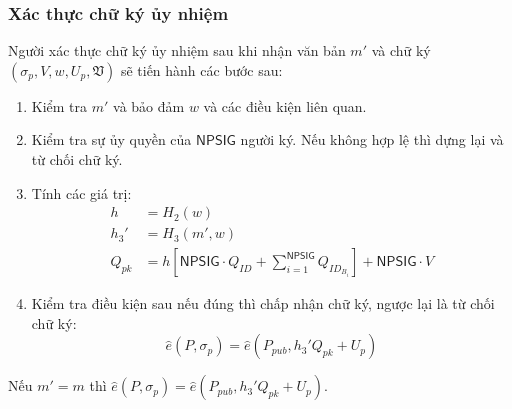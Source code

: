 \subsubsection{Xác thực chữ ký ủy nhiệm}
Người xác thực chữ ký ủy nhiệm sau khi nhận văn bản $m'$ và chữ ký  $(\sigma_p,V,w,U_p,\mathfrak{V})$ sẽ tiến hành các bước sau:
\begin{enumerate}[label=(\arabic*)]
	\item Kiểm tra $m'$ và bảo đảm $w$ và các điều kiện liên quan.
	\item Kiểm tra sự ủy quyền của $\mathsf{NPSIG}$ người ký. Nếu không hợp lệ thì dựng lại và từ chối chữ ký.
	\item Tính các giá trị:
	\begin{align*}
	h &=H_2(w) \\
	h_3' &= H_3(m',w) \\
	Q_{pk} &= h\left[ \mathsf{NPSIG}\cdot Q_{ID} + \sum_{i=1}^{\mathsf{NPSIG}}Q_{ID_{B_i}} \right]  + \mathsf{NPSIG} \cdot V
	\end{align*}
	\item Kiểm tra điều kiện sau nếu đúng thì chấp nhận chữ ký, ngược lại là từ chối chữ ký:
	\begin{equation}
	\hat{e}(P,\sigma_p)  = \hat{e}(P_{pub},h_3'Q_{pk} + U_p)
	\end{equation}
\end{enumerate}

\begin{theorem}
	Nếu $m'=m$ thì $\hat{e}(P,\sigma_p)  = \hat{e}(P_{pub},h_3'Q_{pk} + U_p)$.
\end{theorem}

